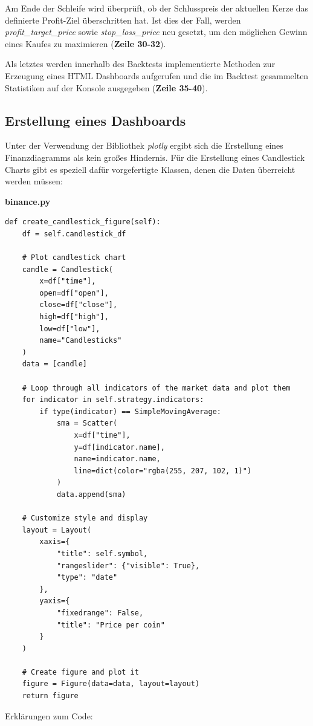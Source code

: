 \documentclass[oneside]{ausarbeitung}
\begin{document}
Am Ende der Schleife wird überprüft, ob der Schlusspreis der aktuellen Kerze das definierte Profit-Ziel überschritten hat. Ist dies der Fall, werden \textit{profit\_target\_price} sowie \textit{stop\_loss\_price} neu gesetzt, um den möglichen Gewinn eines Kaufes zu maximieren (\textbf{Zeile 30-32}).

Als letztes werden innerhalb des Backtests implementierte Methoden zur Erzeugung eines HTML Dashboards aufgerufen und die im Backtest gesammelten Statistiken auf der Konsole ausgegeben (\textbf{Zeile 35-40}). 

\subsection{Erstellung eines Dashboards}
\label{sub:erstellung_eines_dashboards}

Unter der Verwendung der Bibliothek \textit{plotly} ergibt sich die Erstellung eines Finanzdiagramms als kein großes Hindernis. Für die Erstellung eines Candlestick Charts gibt es speziell dafür vorgefertigte Klassen, denen die Daten überreicht werden müssen:

\newpage
\lstset{language=Python}
\lstset{frame=lines}
\lstset{basicstyle=\footnotesize}
\textbf{binance.py}
\begin{lstlisting}
def create_candlestick_figure(self):
	df = self.candlestick_df
	
	# Plot candlestick chart
	candle = Candlestick(
		x=df["time"],
		open=df["open"],
		close=df["close"],
		high=df["high"],
		low=df["low"],
		name="Candlesticks"
	)
	data = [candle]
	
	# Loop through all indicators of the market data and plot them
	for indicator in self.strategy.indicators:
		if type(indicator) == SimpleMovingAverage:
			sma = Scatter(
				x=df["time"],
				y=df[indicator.name],
				name=indicator.name,
				line=dict(color="rgba(255, 207, 102, 1)")
			)
			data.append(sma)
			
	# Customize style and display
	layout = Layout(
		xaxis={
			"title": self.symbol,
			"rangeslider": {"visible": True},
			"type": "date"
		},
		yaxis={
			"fixedrange": False,
			"title": "Price per coin"
		}
	)
	
	# Create figure and plot it
	figure = Figure(data=data, layout=layout)
	return figure
\end{lstlisting}

Erklärungen zum Code:
\end{document}

